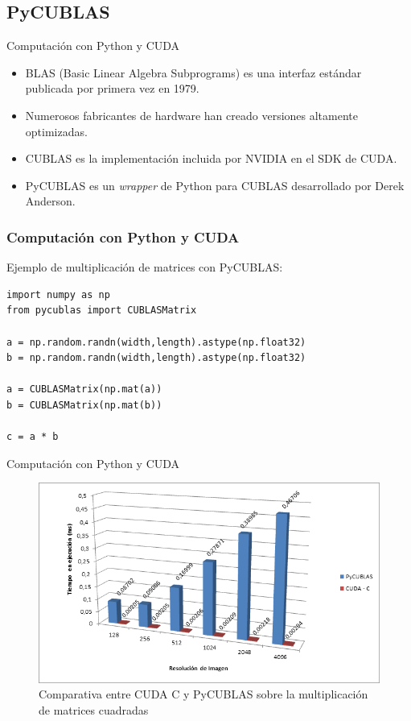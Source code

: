 \documentclass{beamer}
\begin{document}
\subsection{PyCUBLAS}

\begin{frame}{Computación con Python y CUDA}
  \begin{itemize}
    \item BLAS (Basic Linear Algebra Subprograms) es una interfaz estándar publicada por primera vez en 1979.
    \item Numerosos fabricantes de hardware han creado versiones altamente optimizadas.
    \item CUBLAS es la implementación incluida por NVIDIA en el SDK de CUDA.
    \item PyCUBLAS es un \emph{wrapper} de Python para CUBLAS desarrollado por Derek Anderson.
  \end{itemize}
\end{frame}

\begin{frame}[fragile]
\frametitle{Computación con Python y CUDA}
  Ejemplo de multiplicación de matrices con PyCUBLAS:    
  \begin{lstlisting}
import numpy as np
from pycublas import CUBLASMatrix

a = np.random.randn(width,length).astype(np.float32)
b = np.random.randn(width,length).astype(np.float32)

a = CUBLASMatrix(np.mat(a))
b = CUBLASMatrix(np.mat(b))

c = a * b
  \end{lstlisting}
\end{frame}

\begin{frame}{Computación con Python y CUDA}
  \begin{figure}
    \begin{center}
      \includegraphics[width=.8\textwidth]{pycublas.png}
      \caption{Comparativa entre CUDA C y PyCUBLAS sobre la multiplicación de matrices cuadradas}
    \end{center}
  \end{figure}
\end{frame}
\end{document}
